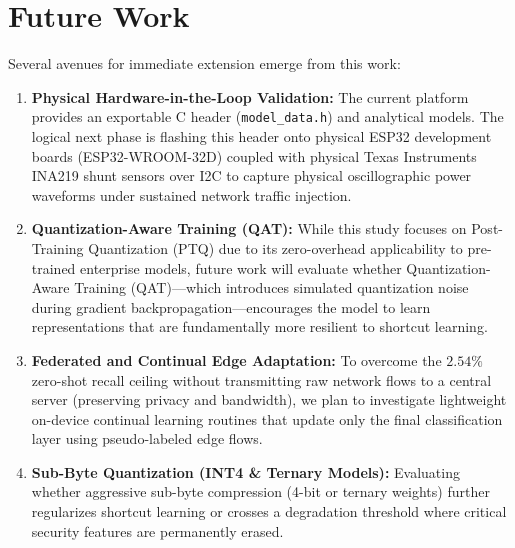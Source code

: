 \section{Future Work}
\label{sec:future}

Several avenues for immediate extension emerge from this work:
\begin{enumerate}
    \item \textbf{Physical Hardware-in-the-Loop Validation:} The current platform provides an exportable C header (\texttt{model\_data.h}) and analytical models. The logical next phase is flashing this header onto physical ESP32 development boards (ESP32-WROOM-32D) coupled with physical Texas Instruments INA219 shunt sensors over I2C to capture physical oscillographic power waveforms under sustained network traffic injection.
    \item \textbf{Quantization-Aware Training (QAT):} While this study focuses on Post-Training Quantization (PTQ) due to its zero-overhead applicability to pre-trained enterprise models, future work will evaluate whether Quantization-Aware Training (QAT)—which introduces simulated quantization noise during gradient backpropagation—encourages the model to learn representations that are fundamentally more resilient to shortcut learning.
    \item \textbf{Federated and Continual Edge Adaptation:} To overcome the $2.54\%$ zero-shot recall ceiling without transmitting raw network flows to a central server (preserving privacy and bandwidth), we plan to investigate lightweight on-device continual learning routines that update only the final classification layer using pseudo-labeled edge flows.
    \item \textbf{Sub-Byte Quantization (INT4 & Ternary Models):} Evaluating whether aggressive sub-byte compression (4-bit or ternary weights) further regularizes shortcut learning or crosses a degradation threshold where critical security features are permanently erased.
\end{enumerate}
